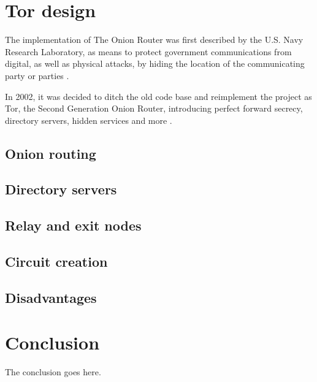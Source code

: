 \documentclass[journal]{IEEEtran}
\begin{document}
		
	\section{Tor design}
		\label{sec:tor}
		The implementation of The Onion Router was first described by the U.S. Navy Research Laboratory, as means to protect government communications from digital, as well as physical attacks, by hiding the location of the communicating party or parties \cite{bib:goldschlag}.
		
		In 2002, it was decided to ditch the old code base and reimplement the project as Tor, the Second Generation Onion Router, introducing perfect forward secrecy, directory servers, hidden services and more \cite{bib:dingledine}.
		
		\subsection{Onion routing}
		
		\subsection{Directory servers}
		
		\subsection{Relay and exit nodes}
		
		\subsection{Circuit creation}
		
		\subsection{Disadvantages}
		
		
	\section{Conclusion}
		The conclusion goes here.
		
		
	\appendices
			
			
\end{document}
